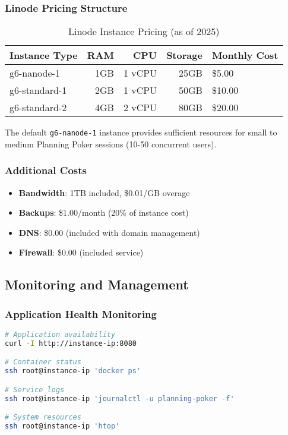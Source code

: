 \documentclass[11pt,a4paper]{article}
\begin{document}
\subsubsection{Linode Pricing Structure}

\begin{table}[H]
\centering
\begin{tabular}{@{}lrrrl@{}}
\toprule
\textbf{Instance Type} & \textbf{RAM} & \textbf{CPU} & \textbf{Storage} & \textbf{Monthly Cost} \\
\midrule
g6-nanode-1 & 1GB & 1 vCPU & 25GB & \$5.00 \\
g6-standard-1 & 2GB & 1 vCPU & 50GB & \$10.00 \\
g6-standard-2 & 4GB & 2 vCPU & 80GB & \$20.00 \\
\bottomrule
\end{tabular}
\caption{Linode Instance Pricing (as of 2025)}
\label{tab:linode-pricing}
\end{table}

The default \texttt{g6-nanode-1} instance provides sufficient resources for small to medium Planning Poker sessions (10-50 concurrent users).

\subsubsection{Additional Costs}

\begin{itemize}
    \item \textbf{Bandwidth}: 1TB included, \$0.01/GB overage
    \item \textbf{Backups}: \$1.00/month (20\% of instance cost)
    \item \textbf{DNS}: \$0.00 (included with domain management)
    \item \textbf{Firewall}: \$0.00 (included service)
\end{itemize}

\subsection{Monitoring and Management}

\subsubsection{Application Health Monitoring}

\begin{lstlisting}[language=bash, caption=Health Check Commands]
# Application availability
curl -I http://instance-ip:8080

# Container status
ssh root@instance-ip 'docker ps'

# Service logs
ssh root@instance-ip 'journalctl -u planning-poker -f'

# System resources
ssh root@instance-ip 'htop'
\end{lstlisting}
\end{document}
